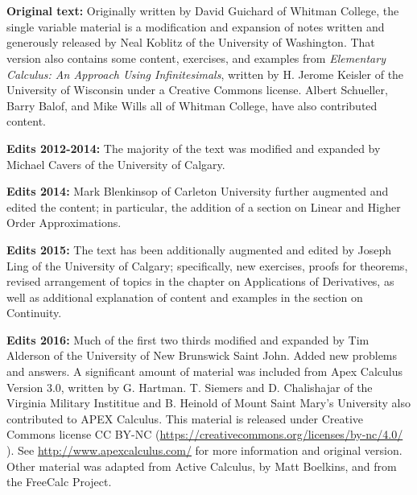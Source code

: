\setcounter{page}{1}
\thispagestyle{empty}
\noindent {\fontsize{24pt}{22pt}\selectfont \booktitle\enskip--\enskip\booksubtitle} \\
{\large \bookauthor}

\bigskip

 \\

\setlength{\parskip}{0pt}
\noindent \textbf{Original text:} Originally written by David Guichard of Whitman College, the single variable material is a modification and expansion of notes written and generously released by Neal Koblitz  of the University of Washington. That version also contains some content, exercises, and examples from \textit{Elementary Calculus: An Approach Using Infinitesimals}, written by H. Jerome Keisler of the University of Wisconsin under a Creative Commons license. Albert Schueller, Barry Balof, and Mike Wills all of Whitman College, have also contributed content.

\medskip

\noindent \textbf{Edits 2012-2014:} The majority of the text was modified and expanded by Michael Cavers of the University of Calgary.

\medskip

\noindent \textbf{Edits 2014:} Mark Blenkinsop of Carleton University further augmented and edited the content; in particular, the addition of a section on Linear and Higher Order Approximations.

\medskip

\noindent \textbf{Edits 2015:} The text has been additionally augmented and edited by Joseph Ling of the University of Calgary; specifically, new exercises, proofs for theorems, revised arrangement of topics in the chapter on Applications of Derivatives, as well as additional explanation of content and examples in the section on Continuity.

\medskip

\noindent \textbf{Edits 2016:} Much of the first two thirds modified and expanded by Tim Alderson of the University of New Brunswick Saint John. Added new problems and answers. A significant amount of material %
was included from Apex Calculus Version 3.0, written by G. Hartman. T. Siemers and D. Chalishajar of the Virginia Military Instititue and B. Heinold of Mount Saint Mary's University also contributed to APEX Calculus. This material is released under Creative Commons license CC BY-NC (\url{https://creativecommons.org/licenses/by-nc/4.0/} ). See \url{http://www.apexcalculus.com/} for more information and original version.\\
Other material %
was adapted from Active Calculus, by Matt Boelkins, and from the FreeCalc Project.   

